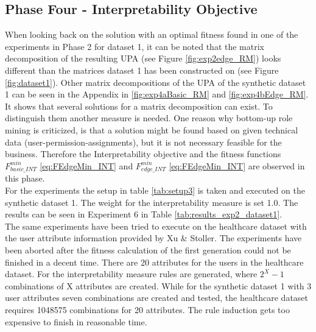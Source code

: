 \newpage
\subsection{Phase Four - Interpretability Objective}
\label{sec:phase4}
When looking back on the solution with an optimal fitness found in one of the experiments in Phase 2 for dataset 1, it can be noted that the matrix decomposition of the resulting UPA (see Figure \ref{fig:exp2edge_RM}) looks different than the matrices dataset 1 has been constructed on (see Figure \ref{fig:dataset1}). Other matrix decompositions of the UPA of the synthetic dataset 1 can be seen in the Appendix in \ref{fig:exp4aBasic_RM} and \ref{fig:exp4bEdge_RM}. It shows that several solutions for a matrix decomposition can exist. To distinguish them another measure is needed. One reason why bottom-up role mining is criticized, is that a solution might be found based on given technical data (user-permission-assignments), but it is not necessary feasible for the business. Therefore the Interpretability objective and the fitness functions
$F_{basic\_INT}^{min}$ \eqref{eq:FEdgeMin_INT} and $F_{edge\_INT}^{min}$ \eqref{eq:FEdgeMin_INT} are observed in this phase.\\
For the experiments the setup in table \ref{tab:setup3} is taken and executed on the synthetic dataset 1. The weight for the interpretability measure is set 1.0. The results can be seen in Experiment 6 in Table \ref{tab:results_exp2_dataset1}.\\
The same experiments have been tried to execute on the healthcare dataset with the user attribute information provided by Xu \& Stoller\cite{Xu}. The experiments have been aborted after the fitness calculation of the first generation could not be finished in a decent time. There are 20 attributes for the users in the healthcare dataset. For the interpretability measure rules are generated, where $2^X-1$ combinations of X attributes are created. While for the synthetic dataset 1 with 3 user attributes seven combinations are created and tested, the healthcare dataset requires 1048575 combinations for 20 attributes. The rule induction gets too expensive to finish in reasonable time.